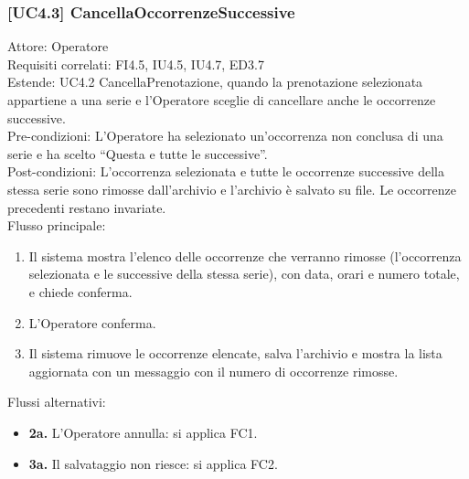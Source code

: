 \subsubsection{[UC4.3] CancellaOccorrenzeSuccessive}
\noindent Attore: Operatore\\
Requisiti correlati: FI4.5, IU4.5, IU4.7, ED3.7\\
Estende: UC4.2 CancellaPrenotazione, quando la prenotazione selezionata appartiene a una serie e l'Operatore sceglie di cancellare anche le occorrenze successive.\\
Pre-condizioni: L'Operatore ha selezionato un'occorrenza non conclusa di una serie e ha scelto ``Questa e tutte le successive''.\\
Post-condizioni: L'occorrenza selezionata e tutte le occorrenze successive della stessa serie sono rimosse dall'archivio e l'archivio è salvato su file. Le occorrenze precedenti restano invariate.\\

\noindent Flusso principale:
\begin{enumerate}
\item Il sistema mostra l'elenco delle occorrenze che verranno rimosse (l'occorrenza selezionata e le successive della stessa serie), con data, orari e numero totale, e chiede conferma.
\item L'Operatore conferma.
\item Il sistema rimuove le occorrenze elencate, salva l'archivio e mostra la lista aggiornata con un messaggio con il numero di occorrenze rimosse.
\end{enumerate}
\noindent Flussi alternativi:
\begin{itemize}
\item \textbf{2a.} L'Operatore annulla: si applica FC1.
\item \textbf{3a.} Il salvataggio non riesce: si applica FC2.
\end{itemize}
